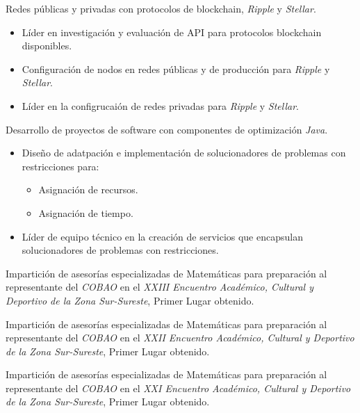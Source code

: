 \documentclass[11pt,letter]{moderncv}
\begin{document}
 {Redes públicas y privadas con protocolos de blockchain, \emph{Ripple} y \emph{Stellar}.
  \begin{itemize}
  \item Líder en investigación y evaluación de API para protocolos blockchain disponibles.
  \item Configuración de nodos en redes públicas y de producción para \emph{Ripple} y \emph{Stellar}.
  \item Líder en la configrucaión de redes privadas para \emph{Ripple} y \emph{Stellar}.
  \end{itemize}
}

 {Desarrollo de proyectos de software
  con componentes de optimización {\em Java}.
  \begin{itemize}
  \item Diseño de adatpación e implementación de solucionadores de problemas con restricciones para:
    \begin{itemize}
    \item Asignación de recursos.
    \item Asignación de tiempo.
    \end{itemize}
  \item Líder de equipo técnico en la creación de servicios que encapsulan solucionadores de problemas con restricciones.
  \end{itemize}
}

 {Impartición de asesorías
  especializadas de Matemáticas para preparación al representante del
  {\em COBAO} en el {\em XXIII Encuentro Académico, Cultural y
    Deportivo de la Zona Sur-Sureste}, Primer Lugar obtenido.}

 {Impartición de asesorías
  especializadas de Matemáticas para preparación al representante del
  {\em COBAO} en el {\em XXII Encuentro Académico, Cultural y
    Deportivo de la Zona Sur-Sureste}, Primer Lugar obtenido.}

 {Impartición de asesorías
  especializadas de Matemáticas para preparación al representante del
  {\em COBAO} en el {\em XXI Encuentro Académico, Cultural y Deportivo
    de la Zona Sur-Sureste}, Primer Lugar obtenido.}
\end{document}
